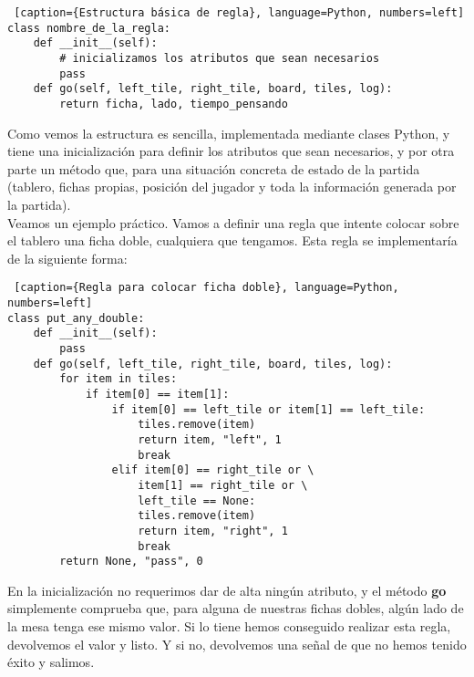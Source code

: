 \begin{lstlisting} [caption={Estructura básica de regla}, language=Python, numbers=left]
class nombre_de_la_regla:
    def __init__(self):
        # inicializamos los atributos que sean necesarios
        pass
    def go(self, left_tile, right_tile, board, tiles, log):
        return ficha, lado, tiempo_pensando
\end{lstlisting}

Como vemos la estructura es sencilla, implementada mediante clases Python, y tiene una inicialización para definir los
atributos que sean necesarios, y por otra parte un método que, para una situación concreta de estado de la partida
(tablero, fichas propias, posición del jugador y toda la información generada por la partida). \\

Veamos un ejemplo práctico. Vamos a definir una regla que intente colocar sobre el tablero una ficha doble, cualquiera
que tengamos. Esta regla se implementaría de la siguiente forma:

\begin{lstlisting} [caption={Regla para colocar ficha doble}, language=Python, numbers=left]
class put_any_double:
    def __init__(self):
        pass
    def go(self, left_tile, right_tile, board, tiles, log):
        for item in tiles:
            if item[0] == item[1]:
                if item[0] == left_tile or item[1] == left_tile:
                    tiles.remove(item)
                    return item, "left", 1
                    break
                elif item[0] == right_tile or \
                    item[1] == right_tile or \
                    left_tile == None:
                    tiles.remove(item)
                    return item, "right", 1
                    break
        return None, "pass", 0
\end{lstlisting}

En la inicialización no requerimos dar de alta ningún atributo, y el método \textbf{go} simplemente comprueba que, para
alguna de nuestras fichas dobles, algún lado de la mesa tenga ese mismo valor. Si lo tiene hemos conseguido realizar
esta regla, devolvemos el valor y listo. Y si no, devolvemos una señal de que no hemos tenido éxito y salimos. \\

